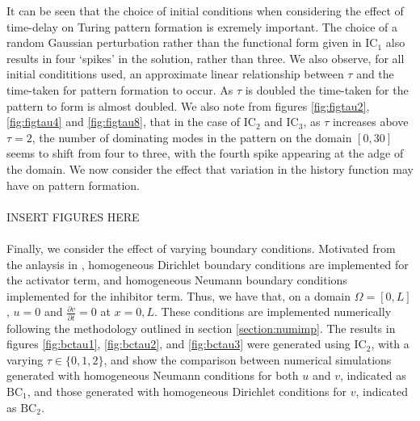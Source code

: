 \documentclass[12pt]{report}
\begin{document}
It can be seen that the choice of initial conditions when considering the effect of time-delay on Turing pattern formation is exremely important. The choice of a random Gaussian perturbation rather than the functional form given in $\text{IC}_1$ also results in four `spikes' in the solution, rather than three. We also observe, for all initial condititions used, an approximate linear relationship between $\tau$ and the time-taken for pattern formation to occur. As $\tau$ is doubled the time-taken for the pattern to form is almost doubled. We also note from figures \ref{fig:figtau2}, \ref{fig:figtau4} and \ref{fig:figtau8}, that in the case of $\text{IC}_2$ and $\text{IC}_3$, as $\tau$ increases above $\tau=2$, the number of dominating modes in the pattern on the domain $[0,30]$ seems to shift from four to three, with the fourth spike appearing at the adge of the domain.
 We now consider the effect that variation in the history function may have on pattern formation.
\\
\\
INSERT FIGURES HERE
\\
\\
Finally, we consider the effect of varying boundary conditions. Motivated from the anlaysis in \cite{krausemixed}, homogeneous Dirichlet boundary conditions are implemented for the activator term, and homogeneous Neumann boundary conditions implemented for the inhibitor term. Thus, we have that, on a domain $\Omega=[0,L]$, $u=0$ and $\frac{\partial v}{\partial t}=0$ at $x=0, L$. These conditions are implemented numerically following the methodology outlined in section \ref{section:numimp}. The results in figures \ref{fig:bctau1}, \ref{fig:bctau2}, and \ref{fig:bctau3} were generated using $\text{IC}_2$, with a varying $\tau\in\{0,1,2\}$, and show the comparison between numerical simulations generated with homogeneous Neumann conditions for both $u$ and $v$, indicated as $\text{BC}_1$, and those generated with homogeneous Dirichlet conditions for $v$, indicated as $\text{BC}_2$.
\end{document}

